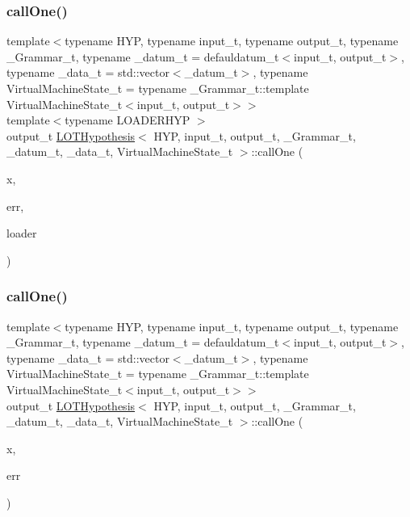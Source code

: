 \subsubsection{\texorpdfstring{call\+One()}{callOne()}\hspace{0.1cm}{\footnotesize\ttfamily [1/2]}}
{\footnotesize\ttfamily template$<$typename H\+YP, typename input\+\_\+t, typename output\+\_\+t, typename \+\_\+\+Grammar\+\_\+t, typename \+\_\+datum\+\_\+t = defauldatum\+\_\+t$<$input\+\_\+t, output\+\_\+t$>$, typename \+\_\+data\+\_\+t = std\+::vector$<$\+\_\+datum\+\_\+t$>$, typename Virtual\+Machine\+State\+\_\+t = typename \+\_\+\+Grammar\+\_\+t\+::template Virtual\+Machine\+State\+\_\+t$<$input\+\_\+t, output\+\_\+t$>$$>$ \\
template$<$typename L\+O\+A\+D\+E\+R\+H\+YP $>$ \\
output\+\_\+t \hyperlink{class_l_o_t_hypothesis}{L\+O\+T\+Hypothesis}$<$ H\+YP, input\+\_\+t, output\+\_\+t, \+\_\+\+Grammar\+\_\+t, \+\_\+datum\+\_\+t, \+\_\+data\+\_\+t, Virtual\+Machine\+State\+\_\+t $>$\+::call\+One (\begin{DoxyParamCaption}\item[{const input\+\_\+t}]{x,  }\item[{const output\+\_\+t}]{err,  }\item[{L\+O\+A\+D\+E\+R\+H\+YP $\ast$}]{loader }\end{DoxyParamCaption})\hspace{0.3cm}{\ttfamily [inline]}}

\mbox{\label{class_l_o_t_hypothesis_a834197767cb83a17c6b3eb564e11a3b2}} 
\subsubsection{\texorpdfstring{call\+One()}{callOne()}\hspace{0.1cm}{\footnotesize\ttfamily [2/2]}}
{\footnotesize\ttfamily template$<$typename H\+YP, typename input\+\_\+t, typename output\+\_\+t, typename \+\_\+\+Grammar\+\_\+t, typename \+\_\+datum\+\_\+t = defauldatum\+\_\+t$<$input\+\_\+t, output\+\_\+t$>$, typename \+\_\+data\+\_\+t = std\+::vector$<$\+\_\+datum\+\_\+t$>$, typename Virtual\+Machine\+State\+\_\+t = typename \+\_\+\+Grammar\+\_\+t\+::template Virtual\+Machine\+State\+\_\+t$<$input\+\_\+t, output\+\_\+t$>$$>$ \\
output\+\_\+t \hyperlink{class_l_o_t_hypothesis}{L\+O\+T\+Hypothesis}$<$ H\+YP, input\+\_\+t, output\+\_\+t, \+\_\+\+Grammar\+\_\+t, \+\_\+datum\+\_\+t, \+\_\+data\+\_\+t, Virtual\+Machine\+State\+\_\+t $>$\+::call\+One (\begin{DoxyParamCaption}\item[{const input\+\_\+t}]{x,  }\item[{const output\+\_\+t}]{err }\end{DoxyParamCaption})\hspace{0.3cm}{\ttfamily [inline]}}

